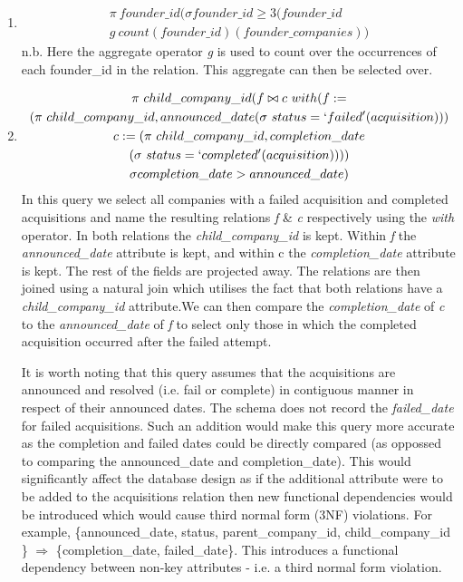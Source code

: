 \documentclass[12pt]{article}
\begin{document}
\begin{enumerate}
  \item\label{part1}\begin{multline*} \pi \ founder\_id (\sigma founder\_id \geq 3 (founder\_id \ \\
  g \ count (founder\_id) (founder\_companies))
 \end{multline*}
 n.b. Here the aggregate operator \emph{g} is used to count over the occurrences of each founder\_id in the relation. This aggregate can then be selected over.
  \item\label{part1}\begin{multline*}
  \pi \ child\_company\_id (f \bowtie c \ with (f := \\
  (\pi \ child\_company\_id, announced\_date (\sigma \ status = `failed' (acquisition))) \\
  c := (\pi \ child\_company\_id, completion\_date \\
  (\sigma \ status = `completed' (acquisition)))
  ) \\
  \sigma completion\_date > announced\_date)
 \end{multline*}
 In this query we select all companies with a failed acquisition and completed acquisitions and name the resulting relations \emph{f} \& \emph{c} respectively using the \emph{with} operator. In both relations the \emph{child\_company\_id} is kept. Within \emph{f} the \emph{announced\_date} attribute is kept, and within {c} the \emph{completion\_date} attribute is kept. The rest of the fields are projected away. The relations are then joined using a natural join which utilises the fact that both relations have a \emph{child\_company\_id} attribute.We can then compare the \emph{completion\_date} of \emph{c} to the \emph{announced\_date} of \emph{f} to select only those in which the completed acquisition occurred after the failed attempt.

 It is worth noting that this query assumes that the acquisitions are announced and resolved (i.e. fail or complete) in contiguous manner in respect of their announced dates. The schema does not record the \emph {failed\_date} for failed acquisitions. Such an addition would make this query more accurate as the completion and failed dates could be directly compared (as oppossed to comparing the announced\_date and completion\_date). This would significantly affect the database design as if the additional attribute were to be added to the acquisitions relation then new functional dependencies would be introduced which would cause third normal form (3NF) violations. For example, \{{announced\_date, status, parent\_company\_id, child\_company\_id }\} $\Rightarrow$ \{{completion\_date, failed\_date}\}. This introduces a functional dependency between non-key attributes - i.e. a third normal form violation.


\end{enumerate}
\end{document}
